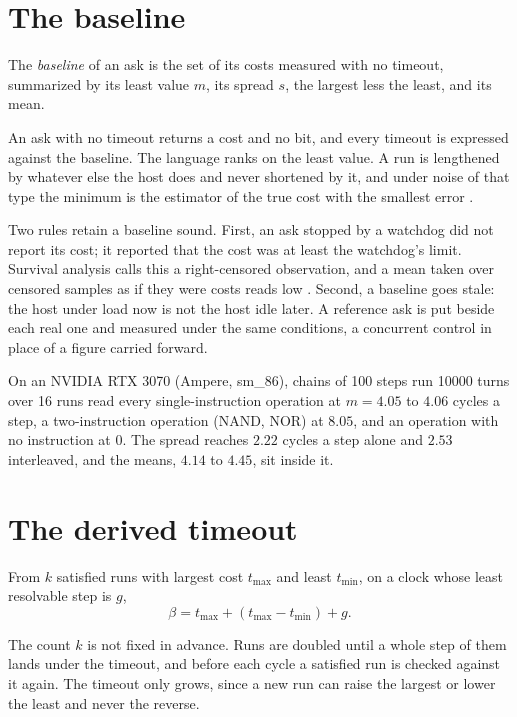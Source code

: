 \section{The baseline}

\begin{definition}[Baseline]
The \emph{baseline} of an ask is the set of its costs measured with no timeout, summarized by its
least value \(m\), its spread \(s\), the largest less the least, and its mean.
\end{definition}

An ask with no timeout returns a cost and no bit, and every timeout is expressed
against the baseline. The language ranks on the least value. A run is lengthened by whatever
else the host does and never shortened by it, and under noise of that type the minimum is the
estimator of the true cost with the smallest error \cite{src:Chen-Revels}.

Two rules retain a baseline sound. First, an ask stopped by a watchdog did not report its cost; it
reported that the cost was at least the watchdog's limit. Survival analysis calls this a
right-censored observation, and a mean taken over censored samples as if they were costs reads
low \cite{src:Kaplan-Meier}. Second, a baseline goes stale: the host under load now is not the
host idle later. A reference ask is put beside each real one and measured under the same
conditions, a concurrent control in place of a figure carried forward.

On an NVIDIA RTX 3070 (Ampere, sm\_86), chains of 100 steps run 10000 turns over 16 runs read
every single-instruction operation at \(m = 4.05\) to \(4.06\) cycles a step, a two-instruction
operation (NAND, NOR) at \(8.05\), and an operation with no instruction at \(0\). The spread
reaches \(2.22\) cycles a step alone and \(2.53\) interleaved, and the means, \(4.14\) to \(4.45\),
sit inside it.

\section{The derived timeout}

\begin{definition}
From \(k\) satisfied runs with largest cost \(t_{\max}\) and least \(t_{\min}\), on a clock whose least
resolvable step is \(g\),
\[
  \beta = t_{\max} + (t_{\max} - t_{\min}) + g.
\]
\end{definition}

The count \(k\) is not fixed in advance. Runs are doubled until a whole step of them lands under
the timeout, and before each cycle a satisfied run is checked against it again. The timeout only grows,
since a new run can raise the largest or lower the least and never the reverse.

